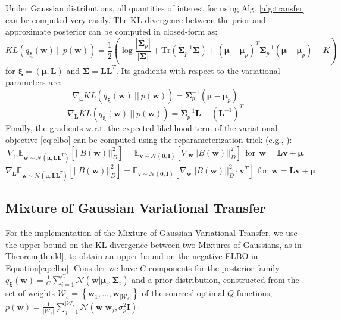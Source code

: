 \documentclass{article}
\newcommand{\abs}[1]{\left\lvert #1 \right\rvert}
\begin{document}
Under Gaussian distributions, all quantities of interest for using Alg. \ref{alg:transfer} can be computed very easily. The KL divergence between the prior and approximate posterior can be computed in closed-form as:
\begin{equation}
KL\left(q_{\bm{\xi}}(\bm{w})\ ||\ p(\bm{w})\right) = \frac{1}{2}\left( \log\frac{\left\lvert \bm{\Sigma}_p \right\rvert}{\left\lvert \bm{\Sigma} \right\rvert} + \text{Tr}\left( \bm{\Sigma}_p^{-1}\bm{\Sigma} \right) + (\bm{\mu} - \bm{\mu}_p)^T \bm{\Sigma}_p^{-1} (\bm{\mu} - \bm{\mu}_p) -K \right)
\end{equation}
for $\bm{\xi} = (\bm{\mu},\bm{L})$ and $\bm{\Sigma} = \bm{LL}^T$. Its gradients with respect to the variational parameters are:
\begin{equation}\label{eq:klgradmu}
\nabla_{\bm{\mu}} KL\left(q_{\bm{\xi}}(\bm{w})\ ||\ p(\bm{w})\right) = \bm{\Sigma}_p^{-1} (\bm{\mu} - \bm{\mu}_p)
\end{equation}
\begin{equation}\label{eq:klgradL}
\nabla_{\bm{L}} KL\left(q_{\bm{\xi}}(\bm{w})\ ||\ p(\bm{w})\right) = \bm{\Sigma}_p^{-1}\bm{L} - (\bm{L}^{-1})^T 
\end{equation}
Finally, the gradients w.r.t. the expected likelihood term of the variational objective \eqref{eq:elbo} can be computed using the reparameterization trick (e.g., \cite{hoffman2013stochastic,rezende2014stochastic}):
\begin{equation}\label{eq:tdgradmu}
\nabla_{\bm{\mu}} \mathbb{E}_{\bm{w} \sim \mathcal{N}(\bm{\mu},\bm{LL}^T)}\left[ ||B(\bm{w})||_{D}^2 \right] = \mathbb{E}_{\bm{v} \sim \mathcal{N}(\bm{0},\bm{I})}\left[ \nabla_{\bm{w}} ||B(\bm{w})||_{D}^2 \right]\ \ \text{for}\ \ \bm{w} = \bm{Lv} + \bm{\mu}
\end{equation} 
\begin{equation}\label{eq:tdgradL}
\nabla_{\bm{L}} \mathbb{E}_{\bm{w} \sim \mathcal{N}(\bm{\mu},\bm{LL}^T)}\left[ ||B(\bm{w})||_{D}^2 \right] = \mathbb{E}_{\bm{v} \sim \mathcal{N}(\bm{0},\bm{I})}\left[ \nabla_{\bm{w}} ||B(\bm{w})||_{D}^2 \cdot \bm{v}^T \right]\ \ \text{for}\ \ \bm{w} = \bm{Lv} + \bm{\mu}
\end{equation}

\subsection{Mixture of Gaussian Variational Transfer}

For the implementation of the Mixture of Gaussian Variational Transfer, we use the upper bound on the KL divergence between two Mixtures of Gaussians, as in Theorem\ref{th:ukl}, to obtain an upper bound on the negative ELBO in Equation\ref{eq:elbo}. Consider we have $C$ components for the posterior family $q_{\bm{\xi}}(\bm{w}) = \frac{1}{C}\sum_{i=1}^C\mathcal{N}(\bm{w}|\bm{\mu}_i,\bm{\Sigma}_i)$ and a prior distribution, constructed from the set of weights $\mathcal{W}_s = \left\lbrace \bm{w}_1,..., \bm{w}_{|\mathcal{W}_s|} \right\rbrace$ of the sources' optimal $Q$-functions, $p(\bm{w}) = \frac{1}{\abs{\mathcal{W}_s}}\sum_{j=1}^{|\mathcal{W}_s|}\mathcal{N}(\bm{w}|\bm{w}_j,\sigma_p^2\bm{I})$.
\end{document}
